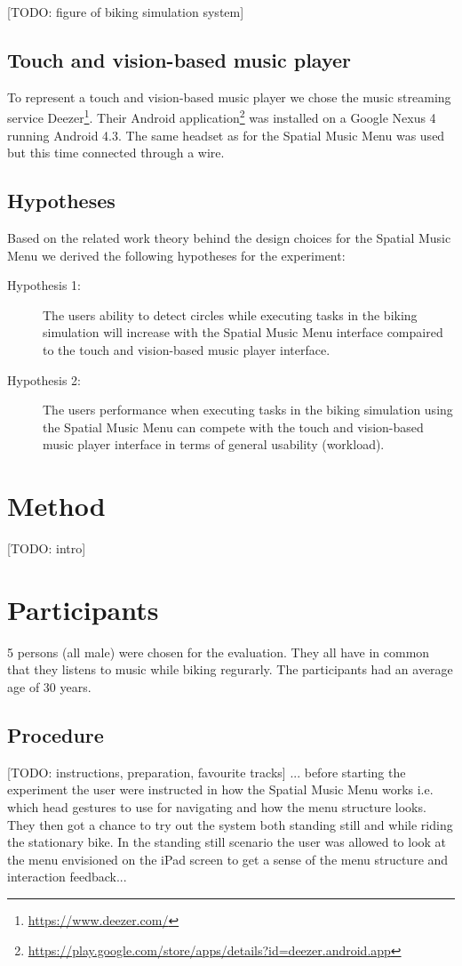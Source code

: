 [TODO: figure of biking simulation system]

\subsection{Touch and vision-based music player}
To represent a touch and vision-based music player we chose the music streaming service Deezer\footnote{\url{https://www.deezer.com/}}. Their Android application\footnote{\url{https://play.google.com/store/apps/details?id=deezer.android.app}} was installed on a Google Nexus 4 running Android 4.3. The same headset as for the Spatial Music Menu was used but this time connected through a wire.

\subsection{Hypotheses}
Based on the related work theory behind the design choices for the Spatial Music Menu we derived the following hypotheses for the experiment:

\begin{description}
\item[Hypothesis 1:] The users ability to detect circles while executing tasks in the biking simulation will increase with the Spatial Music Menu interface compaired to the touch and vision-based music player interface.
\end{description}

\begin{description}
\item[Hypothesis 2:] The users performance when executing tasks in the biking simulation using the Spatial Music Menu can compete with the touch and vision-based music player interface in terms of general usability (workload).
\end{description}


\section{Method}
[TODO: intro]

\section{Participants}
5 persons (all male) were chosen for the evaluation. They all have in common that they listens to music while biking regurarly. The participants had an average age of 30 years.

\subsection{Procedure}
[TODO: instructions, preparation, favourite tracks]
... before starting the experiment the user were instructed in how the Spatial Music Menu works i.e. which head gestures to use for navigating and how the menu structure looks. They then got a chance to try out the system both standing still and while riding the stationary bike. In the standing still scenario the user was allowed to look at the menu envisioned on the iPad screen to get a sense of the menu structure and interaction feedback...

